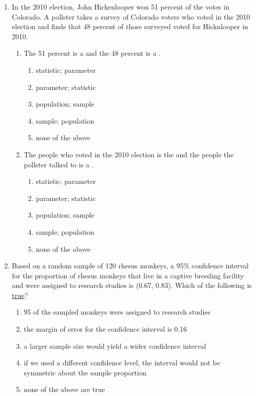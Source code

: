 \documentclass[12pt,fullpage]{amsart}
\begin{document}
\begin{enumerate}
\begin{enumerate}
\end{enumerate}


\item In the 2010 election, John Hickenlooper won 51 percent of the votes in Colorado. A pollster takes a survey of Colorado voters who voted in the 2010 election and finds that 48 percent of those surveyed voted for Hicknlooper in 2010.

  \begin{enumerate}
  \item The 51 percent is a \blank[2cm] and the 48 percent is a \blank[2cm].
\begin{multicols}{3}
    \begin{enumerate}
\item   statistic; parameter
\item	parameter; statistic
\item	population; sample
\item sample; population
\item none of the above
    \end{enumerate}
\end{multicols}

\item The people who voted in the 2010 election is the \blank[2cm] and the people the pollster talked to is a \blank[2cm].
  \begin{multicols}{3}
    \begin{enumerate}
\item   statistic; parameter
\item	parameter; statistic
\item	population; sample
\item sample; population
\item none of the above
\end{enumerate}
  \end{multicols}
  \end{enumerate}

  
\item
Based on a random sample of 120 rhesus monkeys, a 95\% confidence interval for the proportion of rhesus monkeys that live in a captive breeding facility and were assigned to research studies is (0.67, 0.83).  Which of the following is \underline{true}?
\begin{enumerate}
\item	95 of the sampled monkeys were assigned to research studies
\item	the margin of error for the confidence interval is 0.16
\item	a larger sample size would yield a wider confidence interval
\item	if we used a different confidence level, the interval would not be symmetric about the sample proportion
\item	none of the above are true
\end{enumerate}


\end{enumerate}
\end{document}
